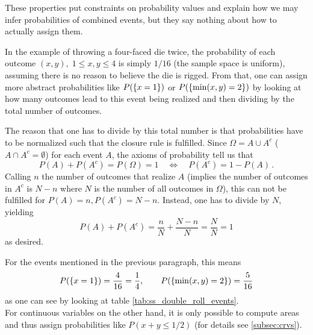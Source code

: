 These properties put constraints on probability values and explain how we may infer probabilities of combined events, but they say nothing about how to actually assign them.

\begin{ex}
In the example of throwing a four-faced die twice, the probability of each outcome $(x, y), \; 1 \leq x, y \leq 4$ is simply $1 / 16$ (the sample space is uniform), assuming there is no reason to believe the die is rigged. From that, one can assign more abstract probabilities like $P(\qty{x = 1})$ or $P(\qty{\min(x, y) = 2})$ by looking at how many outcomes lead to this event being realized and then dividing by the total number of outcomes.

The reason that one has to divide by this total number is that probabilities have to be normalized such that the closure rule is fulfilled. Since $\Omega = A \cup A^c$ ($A \cap A^c = \emptyset$) for each event $A$, the axioms of probability tell us that
\begin{equation}
P(A) + P(A^c) = P(\Omega) = 1 \quad \Leftrightarrow \quad P(A^c) = 1 - P(A) \, .
\end{equation}
Calling $n$ the number of outcomes that realize $A$ (implies the number of outcomes in $A^c$ is $N - n$ where $N$ is the number of all outcomes in $\Omega$), this can not be fulfilled for $P(A) = n, P(A^c) = N - n$. Instead, one has to divide by $N$, yielding
\begin{equation*}
P(A) + P(A^c) = \frac{n}{N} + \frac{N - n}{N} = \frac{N}{N} = 1
\end{equation*}
as desired.


For the events mentioned in the previous paragraph, this means
\begin{equation*}
P(\qty{x = 1}) = \frac{4}{16} = \frac{1}{4}, \qquad P(\qty{\min(x, y) = 2}) = \frac{5}{16}
\end{equation*}
as one can see by looking at table \ref{tab:ss_double_roll_events}.\\


For continuous variables on the other hand, it is only possible to compute areas and thus assign probabilities like $P(x + y \leq 1/ 2)$ (for details see \ref{subsec:crvs}).
\end{ex}


